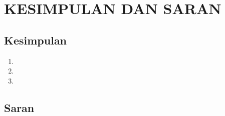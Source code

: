 \chapter{\normalsize KESIMPULAN DAN SARAN}

\section{Kesimpulan}

\lipsum[1]

\begin{enumerate}
	\item 
	\item \item
\end{enumerate}




\section{Saran}

\lipsum[2]
